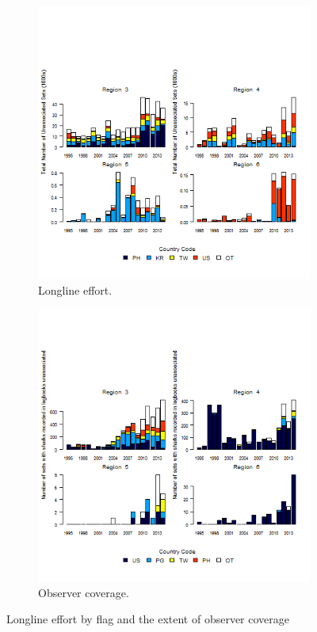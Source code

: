 \documentclass[12pt]{SCreport}
\begin{document}
\begin{landscape}
\begin{figure}
   \begin{subfigure}[b]{0.49\textwidth}
       \includegraphics[width=\textwidth]{../GRAPHICS/Defined/FIG_08c_ps_total_effUnassociated}
       \caption{Longline effort.}
       \label{fig:test1}
   \end{subfigure}
   \begin{subfigure}[b]{0.49\textwidth}
       \includegraphics[width=\textwidth]{../GRAPHICS/Defined/FIG_08d_ps_oper_shks_rep_cntry_unassociated}
       \caption{Observer coverage.}
       \label{fig:test2}
   \end{subfigure}
\caption{Longline effort by flag and the extent of observer coverage}
\label{fig:test} 
\end{figure}
\end{landscape}
\end{document}
